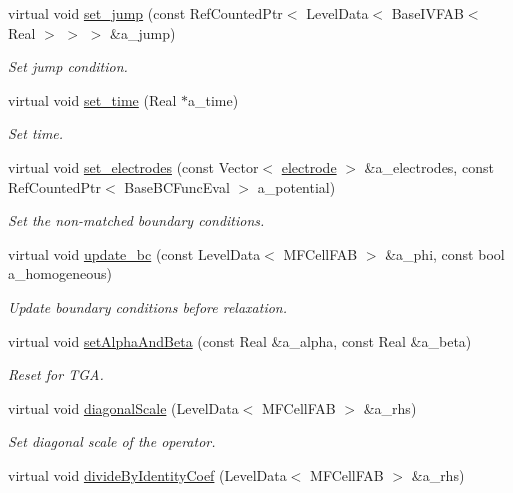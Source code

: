 \begin{DoxyCompactItemize}
virtual void \hyperlink{classmfconductivityop_a40b3737b3d29a0c73937468e3ca7b177}{set\+\_\+jump} (const Ref\+Counted\+Ptr$<$ Level\+Data$<$ Base\+I\+V\+F\+AB$<$ Real $>$ $>$ $>$ \&a\+\_\+jump)
\begin{DoxyCompactList}\small\item\em Set jump condition. \end{DoxyCompactList}\item 
virtual void \hyperlink{classmfconductivityop_a4a94b45f3489ec344557e5490ecca6ac}{set\+\_\+time} (Real $\ast$a\+\_\+time)
\begin{DoxyCompactList}\small\item\em Set time. \end{DoxyCompactList}\item 
virtual void \hyperlink{classmfconductivityop_a3f58479437af94ff19175253b75865de}{set\+\_\+electrodes} (const Vector$<$ \hyperlink{classelectrode}{electrode} $>$ \&a\+\_\+electrodes, const Ref\+Counted\+Ptr$<$ Base\+B\+C\+Func\+Eval $>$ a\+\_\+potential)
\begin{DoxyCompactList}\small\item\em Set the non-\/matched boundary conditions. \end{DoxyCompactList}\item 
virtual void \hyperlink{classmfconductivityop_a22e1c56e2763255efec6e80b4c71d53a}{update\+\_\+bc} (const Level\+Data$<$ M\+F\+Cell\+F\+AB $>$ \&a\+\_\+phi, const bool a\+\_\+homogeneous)
\begin{DoxyCompactList}\small\item\em Update boundary conditions before relaxation. \end{DoxyCompactList}\item 
virtual void \hyperlink{classmfconductivityop_a42bfd26cd84d0988bf9f9d9c9d3da1ca}{set\+Alpha\+And\+Beta} (const Real \&a\+\_\+alpha, const Real \&a\+\_\+beta)
\begin{DoxyCompactList}\small\item\em Reset for T\+GA. \end{DoxyCompactList}\item 
virtual void \hyperlink{classmfconductivityop_a922d4253129a00e8acbb401b130be5f8}{diagonal\+Scale} (Level\+Data$<$ M\+F\+Cell\+F\+AB $>$ \&a\+\_\+rhs)
\begin{DoxyCompactList}\small\item\em Set diagonal scale of the operator. \end{DoxyCompactList}\item 
virtual void \hyperlink{classmfconductivityop_abfb331fbcd390b7a9822a15a7eefae63}{divide\+By\+Identity\+Coef} (Level\+Data$<$ M\+F\+Cell\+F\+AB $>$ \&a\+\_\+rhs)

\end{DoxyCompactItemize}
